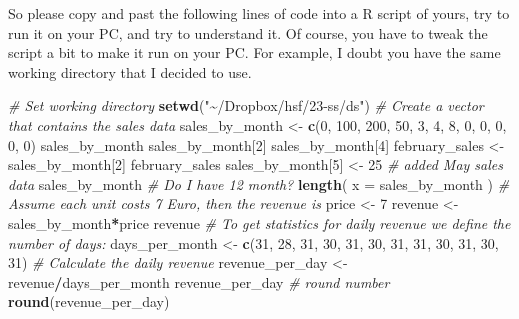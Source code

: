 \documentclass[
  12pt,
  oneside]{book}
\newenvironment{Shaded}{\begin{snugshade}}{\end{snugshade}}
\newcommand{\AttributeTok}[1]{\textcolor[rgb]{0.13,0.29,0.53}{#1}}
\newcommand{\CommentTok}[1]{\textcolor[rgb]{0.56,0.35,0.01}{\textit{#1}}}
\newcommand{\DecValTok}[1]{\textcolor[rgb]{0.00,0.00,0.81}{#1}}
\newcommand{\FunctionTok}[1]{\textcolor[rgb]{0.13,0.29,0.53}{\textbf{#1}}}
\newcommand{\NormalTok}[1]{#1}
\newcommand{\OtherTok}[1]{\textcolor[rgb]{0.56,0.35,0.01}{#1}}
\newcommand{\SpecialCharTok}[1]{\textcolor[rgb]{0.81,0.36,0.00}{\textbf{#1}}}
\newcommand{\StringTok}[1]{\textcolor[rgb]{0.31,0.60,0.02}{#1}}
\theoremstyle{definition}
\theoremstyle{definition}
\theoremstyle{definition}
\theoremstyle{definition}
\theoremstyle{remark}
\begin{document}
So please copy and past the following lines of code into a R script of yours, try to run it on your PC, and try to understand it. Of course, you have to tweak the script a bit to make it run on your PC. For example, I doubt you have the same working directory that I decided to use.

\begin{Shaded}
\begin{Highlighting}[]
\CommentTok{\# Set working directory}
\FunctionTok{setwd}\NormalTok{(}\StringTok{"\textasciitilde{}/Dropbox/hsf/23{-}ss/ds"}\NormalTok{)}
\CommentTok{\# Create a vector that contains the sales data}
\NormalTok{sales\_by\_month }\OtherTok{\textless{}{-}} \FunctionTok{c}\NormalTok{(}\DecValTok{0}\NormalTok{, }\DecValTok{100}\NormalTok{, }\DecValTok{200}\NormalTok{, }\DecValTok{50}\NormalTok{, }\DecValTok{3}\NormalTok{, }\DecValTok{4}\NormalTok{, }\DecValTok{8}\NormalTok{, }\DecValTok{0}\NormalTok{, }\DecValTok{0}\NormalTok{, }\DecValTok{0}\NormalTok{, }\DecValTok{0}\NormalTok{, }\DecValTok{0}\NormalTok{)}
\NormalTok{sales\_by\_month}
\NormalTok{sales\_by\_month[}\DecValTok{2}\NormalTok{]}
\NormalTok{sales\_by\_month[}\DecValTok{4}\NormalTok{]}
\NormalTok{february\_sales }\OtherTok{\textless{}{-}}\NormalTok{ sales\_by\_month[}\DecValTok{2}\NormalTok{]}
\NormalTok{february\_sales}
\NormalTok{sales\_by\_month[}\DecValTok{5}\NormalTok{] }\OtherTok{\textless{}{-}} \DecValTok{25} \CommentTok{\# added May sales data}
\NormalTok{sales\_by\_month}
\CommentTok{\# Do I have 12 month?}
\FunctionTok{length}\NormalTok{( }\AttributeTok{x =}\NormalTok{ sales\_by\_month )}
\CommentTok{\# Assume each unit costs 7 Euro, then the revenue is}
\NormalTok{price }\OtherTok{\textless{}{-}} \DecValTok{7}
\NormalTok{revenue }\OtherTok{\textless{}{-}}\NormalTok{ sales\_by\_month}\SpecialCharTok{*}\NormalTok{price}
\NormalTok{revenue}
\CommentTok{\# To get statistics for daily revenue we define the number of days:}
\NormalTok{days\_per\_month }\OtherTok{\textless{}{-}} \FunctionTok{c}\NormalTok{(}\DecValTok{31}\NormalTok{, }\DecValTok{28}\NormalTok{, }\DecValTok{31}\NormalTok{, }\DecValTok{30}\NormalTok{, }\DecValTok{31}\NormalTok{, }\DecValTok{30}\NormalTok{, }\DecValTok{31}\NormalTok{, }\DecValTok{31}\NormalTok{, }\DecValTok{30}\NormalTok{, }\DecValTok{31}\NormalTok{, }\DecValTok{30}\NormalTok{, }\DecValTok{31}\NormalTok{)}
\CommentTok{\# Calculate the daily revenue}
\NormalTok{revenue\_per\_day }\OtherTok{\textless{}{-}}\NormalTok{ revenue}\SpecialCharTok{/}\NormalTok{days\_per\_month}
\NormalTok{revenue\_per\_day }
\CommentTok{\# round number }
\FunctionTok{round}\NormalTok{(revenue\_per\_day) }
\end{Highlighting}
\end{Shaded}
\end{document}
